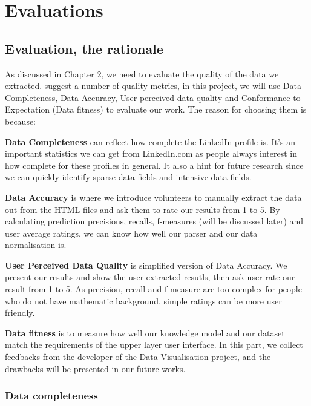 \chapter{Evaluations}\label{chap:eval}

\newcommand{\round}[1]{\DTLround{#1}{#1}{4}#1}

\section{Evaluation, the rationale}

As discussed in Chapter 2, we need to evaluate the quality of the data we extracted. \cite{ochoa2006} suggest a number of quality metrics, in this project, we will use Data Completeness, Data Accuracy, User perceived data quality and Conformance to Expectation (Data fitness) to evaluate our work. The reason for choosing them is because: 

\begin{description}
	\item \textbf{Data Completeness} can reflect how complete the LinkedIn profile is. It's an important statistics we can get from LinkedIn.com as people always interest in how complete for these profiles in general. It also a hint for future research since we can quickly identify sparse data fields and intensive data fields.
	\item \textbf{Data Accuracy} is where we introduce volunteers to manually extract the data out from the HTML files and ask them to rate our results from 1 to 5. By calculating prediction precisions, recalls, f-measures (will be discussed later) and user average ratings, we can know how well our parser and our data normalisation is.
	\item \textbf{User Perceived Data Quality} is simplified version of Data Accuracy. We present our results and show the user extracted resutls, then ask user rate our result from 1 to 5. As precision, recall and f-measure are too complex for people who do not have mathematic background, simple ratings can be more user friendly.
	\item \textbf{Data fitness} is to measure how well our knowledge model and our dataset match the requirements of the upper layer user interface. In this part, we collect feedbacks from the developer of the Data Visualisation project, and the drawbacks will be presented in our future works.
\end{description}

\subsection{Data completeness}

